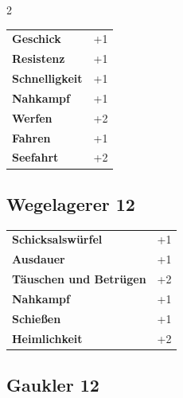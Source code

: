 \begin{multicols}{2}
\begin{tcolorbox}
\begin{tabular}{@{}ll@{}}
    \textbf{Geschick} & +1\\
    \textbf{Resistenz} & +1\\
    \textbf{Schnelligkeit} & +1\\
    \textbf{Nahkampf} & +1\\
    \textbf{Werfen} & +2\\
    \textbf{Fahren} & +1\\
    \textbf{Seefahrt} & +2\\
\end{tabular}


\end{tcolorbox}

\begin{tcolorbox}
    \subsection*{Wegelagerer \hfill \small{12 }}
    \tcblower




\begin{tabular}{@{}ll@{}}
    \textbf{Schicksalswürfel} & +1\\
    \textbf{Ausdauer} & +1\\
    \textbf{Täuschen und Betrügen} & +2\\
    \textbf{Nahkampf} & +1\\
    \textbf{Schießen} & +1\\
    \textbf{Heimlichkeit} & +2\\
\end{tabular}


\end{tcolorbox}

\begin{tcolorbox}
    \subsection*{Gaukler \hfill \small{12 }}
    \tcblower





\end{tcolorbox}
\end{multicols}
